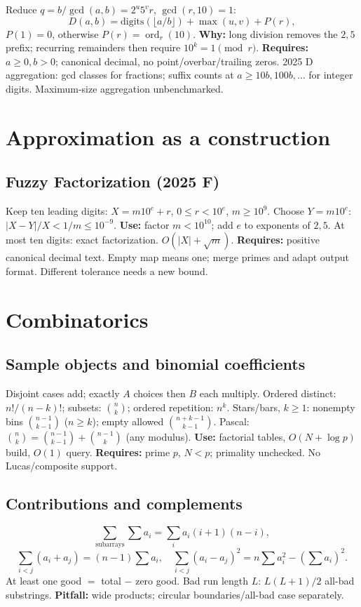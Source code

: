 Reduce $q=b/\gcd(a,b)=2^u5^v r$, $\gcd(r,10)=1$:
\[
D(a,b)=\mathrm{digits}(\lfloor a/b\rfloor)+\max(u,v)+P(r),
\]
$P(1)=0$, otherwise $P(r)=\operatorname{ord}_r(10)$.
\textbf{Why:} long division removes the $2,5$ prefix; recurring remainders
then require $10^k=1\pmod r$.
\textbf{Requires:} $a\ge0,b>0$; canonical decimal, no point/overbar/trailing zeros.
2025 D aggregation: gcd classes for fractions; suffix counts at
$a\ge10b,100b,\ldots$ for integer digits. Maximum-size aggregation unbenchmarked.

\section{Approximation as a construction}
\subsection{Fuzzy Factorization (2025 F)}
Keep ten leading digits: $X=m10^e+r$, $0\le r<10^e$, $m\ge10^9$.
Choose $Y=m10^e$: $|X-Y|/X<1/m\le10^{-9}$.
\textbf{Use:} factor $m<10^{10}$; add $e$ to exponents of $2,5$.
At most ten digits: exact factorization. $O(|X|+\sqrt m)$.
\textbf{Requires:} positive canonical decimal text. Empty map means one;
merge primes and adapt output format. Different tolerance needs a new bound.

\section{Combinatorics}
\subsection{Sample objects and binomial coefficients}
Disjoint cases add; exactly $A$ choices then $B$ each multiply.
Ordered distinct: $n!/(n-k)!$; subsets: $\binom nk$; ordered repetition: $n^k$.
Stars/bars, $k\ge1$: nonempty bins $\binom{n-1}{k-1}$ ($n\ge k$);
empty allowed $\binom{n+k-1}{k-1}$.
Pascal: $\binom nk=\binom{n-1}{k-1}+\binom{n-1}k$ (any modulus).
\textbf{Use:} factorial tables, $O(N+\log p)$ build, $O(1)$ query.
\textbf{Requires:} prime $p$, $N<p$; primality unchecked. No Lucas/composite support.

\subsection{Contributions and complements}
\[
\sum_{\mathrm{subarrays}}\sum a_i=\sum_i a_i(i+1)(n-i),
\]
\[
\sum_{i<j}(a_i+a_j)=(n-1)\sum a_i,
\quad\sum_{i<j}(a_i-a_j)^2=n\sum a_i^2-(\sum a_i)^2.
\]
At least one good $=$ total $-$ zero good.
Bad run length $L$: $L(L+1)/2$ all-bad substrings.
\textbf{Pitfall:} wide products; circular boundaries/all-bad case separately.

